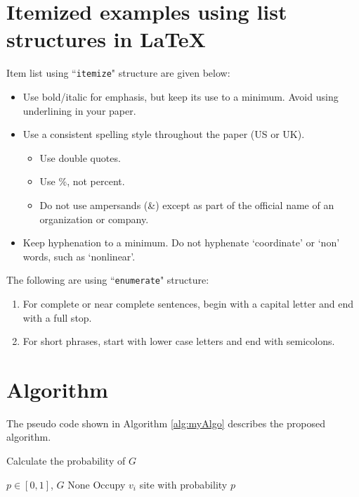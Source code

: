     
\section{Itemized examples using list structures in \LaTeX{}}
\label{SubSec.:bullet}

Item list using ``\texttt{itemize}" structure are given below:

\begin{itemize} 
    
    \item  Use bold/italic for emphasis, but keep its use to a minimum. Avoid using underlining in your paper.
    \item  Use a consistent spelling style throughout the paper (US or UK).
    \begin{itemize}  %
        \item  Use double quotes.
        \item  Use \%, not percent.
        \item  Do not use ampersands (\&) except as part of the official name of an organization or company.
    \end{itemize}
    \item  Keep hyphenation to a minimum. Do not hyphenate `coordinate' or `non' words, such as `nonlinear'.
    
\end{itemize}

The following are using ``\texttt{enumerate}" structure:

\begin{enumerate} 
    
    \item  For complete or near complete sentences, begin with a capital letter and end with a full stop.
    \item  For short phrases, start with lower case letters and end with semicolons.
    
\end{enumerate}

    
\section{Algorithm}
    
    The pseudo code shown in Algorithm \ref{alg:myAlgo} describes the proposed algorithm.
    
    \begin{algorithm}
        \small{
            \caption{Calculate the probability of $G$}\label{alg:myAlgo}
            \begin{algorithmic} [1]
                \Require $p \in [0,1]$, $G$
                \Ensure None
                  
                \State Occupy $v_i$ site with probability $p$ 
                \EndIf
                \EndIf
                \EndFor
            \end{algorithmic}}
        \end{algorithm}
        
